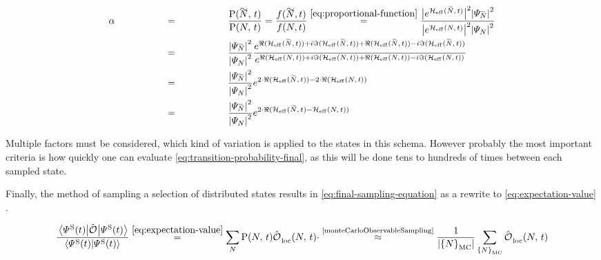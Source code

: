 \begin{equation}
    \label{eq:transition-probability-final}
    \begin{split}
        \alpha &\stackrel{\phantom{\ref{eq:proportional-function}}}{=} \frac{\probabilityOf{\vphantom{N}\smash{\tilde{N}}}{t}}{\probabilityOf{N}{t}} =  \frac{f(\vphantom{N}\smash{\tilde{N}},t)}{f(N,t)}
        \stackrel{\ref{eq:proportional-function}}{=}
        \frac{
            \absSquare{e^{\HeffOft[\vphantom{N}\smash{\tilde{N}}]}} \absSquare{\psiN[\vphantom{N}\smash{\tilde{N}}]}
        }{
            \absSquare{e^{\HeffOft}} \absSquare{\psiN}
        }\\
        &\stackrel{\phantom{\ref{eq:proportional-function}}}{=}
        \frac{\absSquare{\psiN[\vphantom{N}\smash{\tilde{N}}]}}{\absSquare{\psiN}}
        \frac{
            e^{\real\left(\HeffOft[\vphantom{N}\smash{\tilde{N}}]\right) + i\imaginary\left(\HeffOft[\vphantom{N}\smash{\tilde{N}}]\right) +\real\left(\HeffOft[\vphantom{N}\smash{\tilde{N}}]\right)-i \imaginary\left(\HeffOft[\vphantom{N}\smash{\tilde{N}}]\right)}
        }{
            e^{\real\left(\HeffOft\right) + i\imaginary\left(\HeffOft\right) +\real\left(\HeffOft\right)-i \imaginary\left(\HeffOft\right)}
        }\\
        &\stackrel{\phantom{\ref{eq:proportional-function}}}{=}
        \frac{\absSquare{\psiN[\vphantom{N}\smash{\tilde{N}}]}}{\absSquare{\psiN}}
        e^{2\cdot \real\left(\HeffOft[\vphantom{N}\smash{\tilde{N}}]\right) - 2\cdot \real\left(\HeffOft\right)}\\
        &\stackrel{\phantom{\ref{eq:proportional-function}}}{=}
        \frac{\absSquare{\psiN[\vphantom{N}\smash{\tilde{N}}]}}{\absSquare{\psiN}}
        e^{2\cdot \real\left(\HeffOft[\vphantom{N}\smash{\tilde{N}}] - \HeffOft\right)}
    \end{split}
\end{equation}

Multiple factors must be considered, which kind of variation is applied to the states in this schema. 
However probably the most important criteria is how quickly one can evaluate \autoref{eq:transition-probability-final}, as this will be done tens to hundreds of times between each sampled state.

Finally, the method of sampling a selection of distributed states results in \autoref{eq:final-sampling-equation} as a rewrite to \autoref{eq:expectation-value} \cite{monteCarloObservableSampling}.

\begin{equation}
    \label{eq:final-sampling-equation}
    \frac{\bracketHelper{\psiOfT[\schroedingerPicture]}{\ObservableOp}{\psiOfT[\schroedingerPicture]}}{\braketHelper{\psiOfT[\schroedingerPicture]}{\psiOfT[\schroedingerPicture]}} \stackrel{\ref{eq:expectation-value}}{=} 
    \lsum[N]
    \probabilityOf{N}{t}
    \localObservable{N}{t} \cdot
    \stackrel{\text{\cite{monteCarloObservableSampling}}}{\approx} \frac{1}{\left|\left\{N\right\}_\text{MC}\right|} \lsum[\left\{N\right\}_\text{MC}]\localObservable{N}{t}
\end{equation}